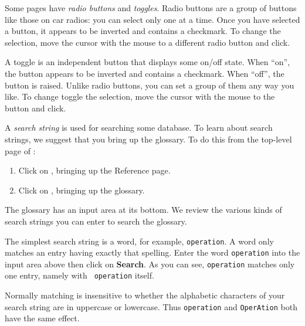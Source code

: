 %
Some pages have {\it radio buttons} and {\it toggles}.
Radio buttons are a group of buttons like those on car radios: you can
select only one at a time.
Once you have selected a button, it appears to be inverted and
contains a checkmark.
To change the selection, move the cursor with the mouse to a different radio
button and click.


A toggle is an independent button that displays some on/off
state.
When ``on'', the button appears to be inverted and
contains a checkmark.
When ``off'', the button is raised.
%
Unlike radio buttons, you can set a group of them any way you like.
To change toggle the selection, move the cursor with the mouse
to the button and click.

%
A {\it search string} is used for searching some database.
To learn about search strings, we suggest that
you bring up the \HyperName{} glossary.
To do this from the top-level page of \HyperName{}:
\begin{enumerate}
\item Click on ,
bringing up the \Language{} Reference page.
\item Click on , bringing up the glossary.
\end{enumerate}

The glossary has an input area at its bottom.
We review the various kinds of search strings
you can enter to search the glossary.

The simplest search string is a word, for example, {\tt operation}.
A word only matches an entry having exactly that spelling.
Enter the word {\tt operation} into the input area above then click on
{\bf Search}.
As you can see, {\tt operation} matches only one entry, namely with {\tt
operation} itself.

Normally matching is insensitive to whether the alphabetic characters of your
search string are in uppercase or lowercase.
Thus {\tt operation} and {\tt OperAtion} both have the same effect.

